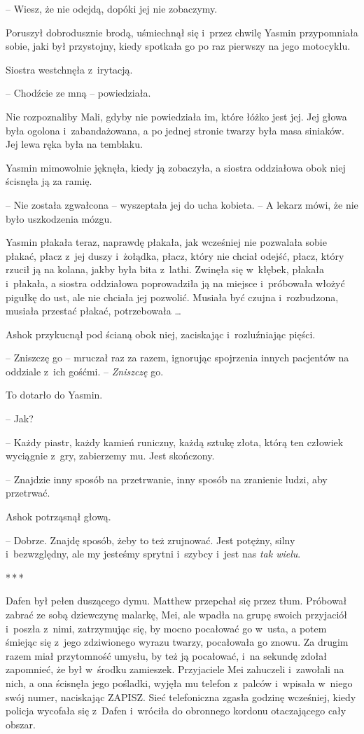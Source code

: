 \documentclass[oneside,polish,11pt,rmheadings]{mwbk}
\newcommand{\threeast}{\par\centerline{*\,*\,*}\medskip\par}
\begin{document}
-- Wiesz, że nie odejdą, dopóki jej nie zobaczymy. 

Poruszył dobrodusznie brodą, uśmiechnął się i~przez chwilę Yasmin przypomniała sobie, jaki był przystojny, kiedy spotkała go po raz pierwszy na jego motocyklu.

Siostra westchnęła z~irytacją. 

-- Chodźcie ze mną -- powiedziała.

Nie rozpoznaliby Mali, gdyby nie powiedziała im, które łóżko jest jej. Jej głowa była ogolona i~zabandażowana, a po jednej stronie twarzy była masa siniaków. Jej lewa ręka była na temblaku.

Yasmin mimowolnie jęknęła, kiedy ją zobaczyła, a siostra oddziałowa obok niej ścisnęła ją za ramię. 

-- Nie została zgwałcona -- wyszeptała jej do ucha kobieta. -- A lekarz mówi, że nie było uszkodzenia mózgu.

Yasmin płakała teraz, naprawdę płakała, jak wcześniej nie pozwalała sobie płakać, płacz z~jej duszy i~żołądka, płacz, który nie chciał odejść, płacz, który rzucił ją na kolana, jakby była bita z~lathi. Zwinęła się w~kłębek, płakała i~płakała, a siostra oddziałowa poprowadziła ją na miejsce i~próbowała włożyć pigułkę do ust, ale nie chciała jej pozwolić. Musiała być czujna i~rozbudzona, musiała przestać płakać, potrzebowała \ldots 

Ashok przykucnął pod ścianą obok niej, zaciskając i~rozluźniając pięści. 

-- Zniszczę go -- mruczał raz za razem, ignorując spojrzenia innych pacjentów na oddziale z~ich gośćmi. -- \textit{Zniszczę }go.

To dotarło do Yasmin. 

-- Jak? 

-- Każdy piastr, każdy kamień runiczny, każdą sztukę złota, którą ten człowiek wyciągnie z~gry, zabierzemy mu. Jest skończony. 

-- Znajdzie inny sposób na przetrwanie, inny sposób na zranienie ludzi, aby przetrwać.

Ashok potrząsnął głową. 

-- Dobrze. Znajdę sposób, żeby to też zrujnować. Jest potężny, silny i~bezwzględny, ale my jesteśmy sprytni i~szybcy i~jest nas \textit{tak wielu}.

\bigskip
\threeast

Dafen był pełen duszącego dymu. Matthew przepchał się przez tłum. Próbował zabrać ze sobą dziewczynę malarkę, Mei, ale wpadła na grupę swoich przyjaciół i~poszła z~nimi, zatrzymując się, by mocno pocałować go w~usta, a potem śmiejąc się z~jego zdziwionego wyrazu twarzy, pocałowała go znowu. Za drugim razem miał przytomność umysłu, by też ją pocałować, i~na sekundę zdołał zapomnieć, że był w~środku zamieszek. Przyjaciele Mei zahuczeli i~zawołali na nich, a ona ścisnęła jego pośladki, wyjęła mu telefon z~palców i~wpisała w~niego swój numer, naciskając ZAPISZ. Sieć telefoniczna zgasła godzinę wcześniej, kiedy policja wycofała się z~Dafen i~wróciła do obronnego kordonu otaczającego cały obszar.
\end{document}
